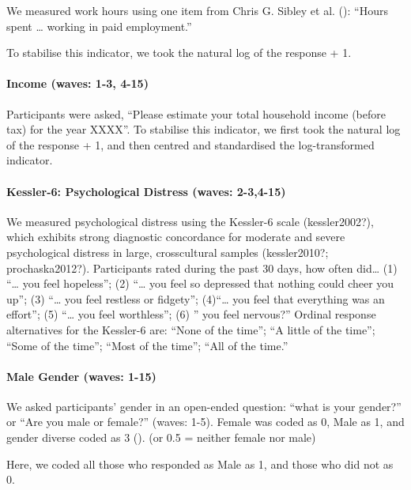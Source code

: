 \documentclass[
  single column]{article}
\let\oldparagraph\paragraph
\renewcommand{\paragraph}[1]{\oldparagraph{#1}\mbox{}}
\begin{document}
We measured work hours using one item from Chris G. Sibley et al.
(): ``Hours spent \ldots{} working in
paid employment.''

To stabilise this indicator, we took the natural log of the response +
1.

\paragraph{Income (waves: 1-3, 4-15)}\label{income-waves-1-3-4-15}

Participants were asked, ``Please estimate your total household income
(before tax) for the year XXXX''. To stabilise this indicator, we first
took the natural log of the response + 1, and then centred and
standardised the log-transformed indicator.

\paragraph{Kessler-6: Psychological Distress (waves:
2-3,4-15)}\label{kessler-6-psychological-distress-waves-2-34-15}

We measured psychological distress using the Kessler-6 scale
(kessler2002?), which exhibits strong diagnostic concordance for
moderate and severe psychological distress in large, crosscultural
samples (kessler2010?; prochaska2012?). Participants rated during the
past 30 days, how often did\ldots{} (1) ``\ldots{} you feel hopeless'';
(2) ``\ldots{} you feel so depressed that nothing could cheer you up'';
(3) ``\ldots{} you feel restless or fidgety''; (4)``\ldots{} you feel
that everything was an effort''; (5) ``\ldots{} you feel worthless'';
(6) '' you feel nervous?'' Ordinal response alternatives for the
Kessler-6 are: ``None of the time''; ``A little of the time''; ``Some of
the time''; ``Most of the time''; ``All of the time.''

\paragraph{Male Gender (waves: 1-15)}\label{male-gender-waves-1-15}

We asked participants' gender in an open-ended question: ``what is your
gender?'' or ``Are you male or female?'' (waves: 1-5). Female was coded
as 0, Male as 1, and gender diverse coded as 3
(). (or 0.5 =
neither female nor male)

Here, we coded all those who responded as Male as 1, and those who did
not as 0.
\end{document}
